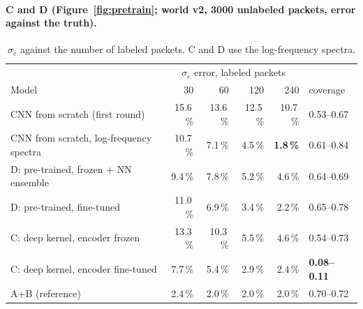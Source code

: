 \documentclass[10pt]{article}
\begin{document}
\paragraph{C and D (Figure~\ref{fig:pretrain}; world v2, 3000 unlabeled packets, error against the truth).}
\begin{table}[h]
\centering\small
\begin{tabular}{lrrrrl}
\toprule
& \multicolumn{4}{c}{$\sigma_e$ error, labeled packets} & \\
Model & 30 & 60 & 120 & 240 & coverage \\
\midrule
CNN from scratch (first round) & 15.6\,\% & 13.6\,\% & 12.5\,\% & 10.7\,\% & 0.53--0.67 \\
CNN from scratch, log-frequency spectra & 10.7\,\% & 7.1\,\% & 4.5\,\% & \textbf{1.8\,\%} & 0.61--0.84 \\
D: pre-trained, frozen + NN ensemble & 9.4\,\% & 7.8\,\% & 5.2\,\% & 4.6\,\% & 0.64--0.69 \\
D: pre-trained, fine-tuned & 11.0\,\% & 6.9\,\% & 3.4\,\% & 2.2\,\% & 0.65--0.78 \\
C: deep kernel, encoder frozen & 13.3\,\% & 10.3\,\% & 5.5\,\% & 4.6\,\% & 0.54--0.73 \\
C: deep kernel, encoder fine-tuned & 7.7\,\% & 5.4\,\% & 2.9\,\% & 2.4\,\% & \textbf{0.08--0.11} \\
A+B (reference) & 2.4\,\% & 2.0\,\% & 2.0\,\% & 2.0\,\% & 0.70--0.72 \\
\bottomrule
\end{tabular}
\caption{$\sigma_e$ against the number of labeled packets. C and D use the log-frequency spectra.}
\label{tab:pretrain}
\end{table}
\end{document}

